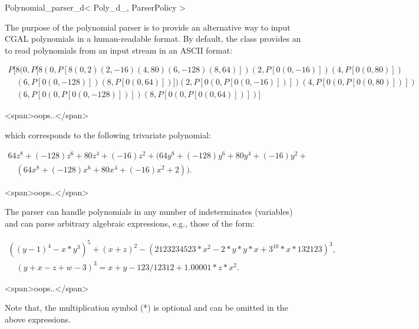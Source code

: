 % 
% 

\begin{ccRefClass}{Polynomial_parser_d< Poly_d_, ParserPolicy >}
\def\ccTagOperatorLayout{\ccFalse}


\ccDefinition

The purpose of the polynomial parser is to provide an alternative way to input CGAL polynomials in a human-readable format. By default, the class  provides an  to read polynomials from an input stream in an ASCII format:
\begin{ccTexOnly}
\[
\begin{array}{l}
P[8(0,P[8(0,P[8(0,2)(2,-16)(4,80)(6,-128)(8,64)])(2,P[0(0,-16)])(4,P[0(0,80)])\\
\quad {}(6,P[0(0,-128)])(8,P[0(0,64)])])(2,P[0(0,P[0(0,-16)])])(4,P[0(0,P[0(0,80)])])\\
\quad {}(6,P[0(0,P[0(0,-128)])])(8,P[0(0,P[0(0,64)])])]
\end{array}
\]
\end{ccTexOnly}
\begin{ccHtmlOnly}
<span>oops..</span>
\end{ccHtmlOnly}
which corresponds to the following trivariate polynomial:
\begin{ccTexOnly}
\[\begin{array}{l}
64z^8 + (-128)z^6 + 80z^4 + (-16)z^2 + (64y^8 + (-128)y^6 + 80y^4 + (-16)y^2 + \\
\quad {}(64x^8 + (-128)x^6 + 80x^4 + (-16)x^2 + 2)).
\end{array}\]
\end{ccTexOnly}
\begin{ccHtmlOnly}
<span>oops..</span>
\end{ccHtmlOnly}
The parser can handle polynomials in any number of indeterminates (variables) and 
can parse arbitrary algebraic expressions, e.g., those of the form: 
\begin{ccTexOnly}
\[\begin{array}{l}
((y-1)^4 - x*y^3)^5 + (x + z)^2 - (2123234523*x^2 - 2*y*y*x + 3^{10}*x*132123)^3,\\
\quad {}(y + x - z + w - 3)^3 = x + y - 123/12312 + 1.00001*z*x^2.
\end{array}\]
\end{ccTexOnly}
\begin{ccHtmlOnly}
<span>oops..</span>
\end{ccHtmlOnly}
Note that, the multiplication symbol (*) is optional and can be omitted in the above expressions.


\end{ccRefClass}

